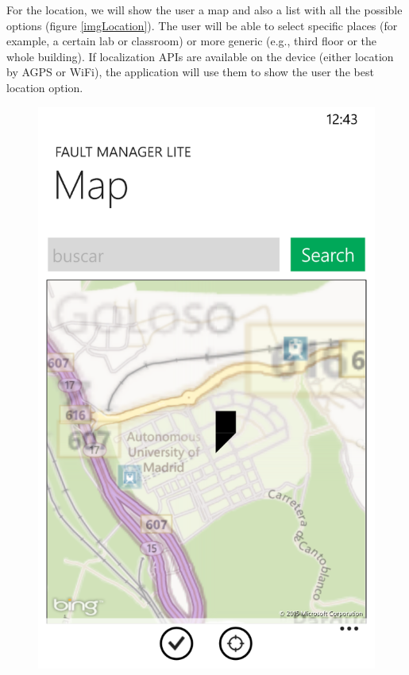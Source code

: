 \documentclass{report}
\begin{document}
For the location, we will show the user a map and also a list with all the possible options (figure \ref{imgLocation}). The user will be able to select specific places (for example, a certain lab or classroom) or more generic (e.g., third floor or the whole building). If localization APIs are available on the device (either location by AGPS or WiFi), the application will use them to show the user the best location option.


\begin{figure}[hbtp]
\centering
\begin{minipage}{0.3\textwidth}
\includegraphics[width=\textwidth]{img/Map.png}

\end{minipage}
\end{figure}
\end{document}
